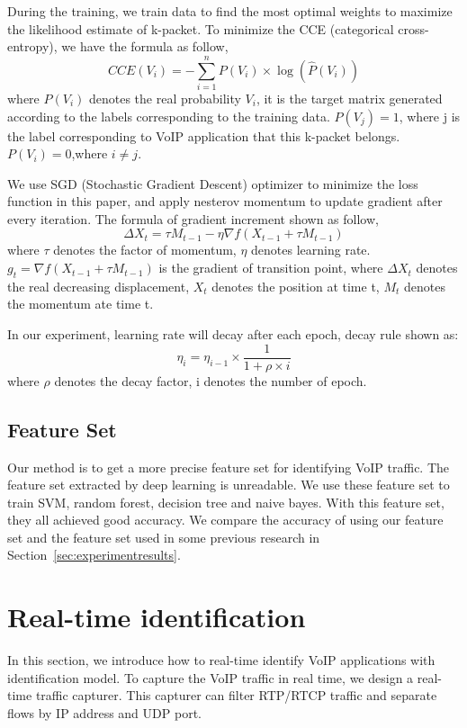 \documentclass[conference]{IEEEtran}
\begin{document}
During the training, we train data to find the most optimal weights to maximize the likelihood estimate of k-packet. To minimize the CCE (categorical cross-entropy), we have the formula as follow,
\begin{equation}
CCE({V_i}) =  - \sum\limits_{i = 1}^n {P({V_i}) \times \log (\hat P({V_i}))}
\end{equation}
where $P({V_i})$ denotes the real probability ${V_i}$, it is the target matrix generated according to the labels corresponding to the training data. $P({V_j})=1$, where j is the label corresponding to VoIP application that this k-packet belongs.$P({V_i})=0$,where $i \ne j$.

We use SGD (Stochastic Gradient Descent) optimizer to minimize the loss function in this paper, and apply nesterov momentum to update gradient after every iteration. The formula of gradient increment shown as follow,
\begin{equation}
\Delta {X_t} = \tau {M_{t - 1}} - \eta \nabla f({X_{t - 1}} + \tau {M_{t - 1}})
\end{equation}
where ${\tau}$ denotes the factor of momentum, ${\eta}$ denotes learning rate. ${g_t} = \nabla f({X_{t - 1}} + \tau {M_{t - 1}})$ is the gradient of transition point, where $\Delta {X_t}$ denotes the real decreasing displacement, ${X_t}$ denotes the position at time t, ${M_t}$ denotes the momentum ate time t.

In our experiment, learning rate will decay after each epoch, decay rule shown as:
\begin{equation}
{\eta _i} = {\eta _{i - 1}} \times \frac{1}{{1 + \rho  \times i}}
\end{equation}
where ${\rho }$ denotes the decay factor, i denotes the number of epoch.

\subsection{Feature Set}
Our method is to get a more precise feature set for identifying VoIP traffic. The feature set extracted by deep learning is unreadable. We use these feature set to train SVM, random forest, decision tree and naive bayes. With this feature set, they all achieved good accuracy. We compare the accuracy of using our feature set and the feature set used in some previous research in Section~\ref{sec:experimentresults}.

\section{Real-time identification}
\label{sec:realtimeidentification}
In this section, we introduce how to real-time identify VoIP applications with identification model. To capture the VoIP traffic in real time, we design a real-time traffic capturer. This capturer can filter RTP/RTCP traffic and separate flows by IP address and UDP port.
\end{document}
